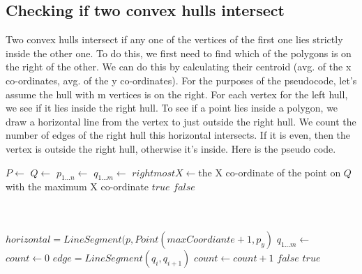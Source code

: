 \documentclass{article}
\begin{document}
\newpage
\subsection{Checking if two convex hulls intersect}

Two convex hulls intersect if any one of the vertices of the first one lies strictly inside the other one. To do this, we first need to find which of the polygons is on the right of the other. We can do this by calculating their centroid (avg. of the x co-ordinates, avg. of the y co-ordinates). For the purposes of the pseudocode, let's assume the hull with m vertices is on the right. For each vertex for the left hull, we see if it lies inside the right hull. To see if a point lies inside a polygon, we draw a horizontal line from the vertex to just outside the right hull. We count the number of edges of the right hull this horizontal intersects. If it is even, then the vertex is outside the right hull, otherwise it's inside. Here is the pseudo code.
\newline
\begin{algorithmic}
	\State $P \gets  $ 
	\State $Q \gets  $ 
	\State $p_{1 \dots n} \gets  $ 
	\State $q_{1 \dots m} \gets  $ 
	\State $rightmostX \gets ${the X co-ordinate of the point on $Q$ with the maximum X co-ordinate}
			\State \Return $true$
		\EndIf
	\EndFor 
	\State \Return $false$  
\EndFunction
\end{algorithmic}
\begin{algorithmic}
	 \\
	 \\
	\State $horizontal = LineSegment(p, Point(maxCoordiante + 1, p_y)$
	\State $q_{1 \dots m} \gets  $ 
	\State $count \gets 0$
		\State $edge = LineSegment (q_i, q_{i+1})$ 
			\State $count \gets count+1$
		\EndIf
	\EndFor
		\State \Return $false$
	\Else
		\State \Return $true$
	\EndIf
\EndFunction
\end{algorithmic}
\end{document}
